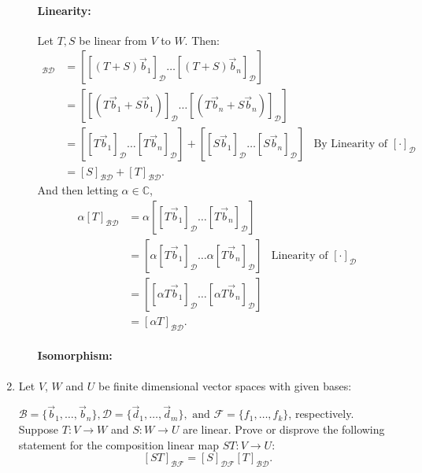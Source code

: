 \documentclass{article}
\begin{document}
\begin{enumerate}
\begin{enumerate}
          \paragraph{Linearity: }Let $T,S$ be linear from $V$ to $W$. Then:
          \begin{align*}
              [T+S]_{\mathcal{B}\mathcal{D}}&= \left[ [(T+S)\vec{b}_1]_\mathcal{D} \ldots [(T+S)\vec{b}_n]_\mathcal{D}  \right] \\
               &= \left[ [(T\vec{b}_1+S\vec{b}_1)]_\mathcal{D} \ldots [(T\vec{b}_n+S\vec{b}_n)]_\mathcal{D}  \right]\\
               &= \left[ [T\vec{b}_1]_\mathcal{D}\ldots [T\vec{b}_n]_\mathcal{D} \right] + \left[ [S\vec{b}_1]_\mathcal{D}\ldots [S\vec{b}_n]_\mathcal{D} \right] &\text{By Linearity of }[\cdot]_\mathcal{D}\\
               &=  [S]_{\mathcal{B}\mathcal{D}} +[T]_{\mathcal{B}\mathcal{D}} 
          .\end{align*}
          And then letting $\alpha\in \mathbb{C}$,
           \begin{align*}
               \alpha[T]_{\mathcal{B}\mathcal{D}}&=\alpha\left[ [T\vec{b}_1]_\mathcal{D}\ldots[T\vec{b}_n]_\mathcal{D} \right] \\
                         &=\left[ \alpha[T\vec{b}_1]_\mathcal{D} \ldots\alpha[T\vec{b}_n]_\mathcal{D}  \right]&\text{Linearity of }[\cdot]_\mathcal{D}\\
                         &=\left[ [\alpha T\vec{b}_1]_\mathcal{D} \ldots[\alpha T\vec{b}_n]_\mathcal{D} \right] \\
               &= [\alpha T]_{\mathcal{B}\mathcal{D}} 
          .\end{align*}
          \paragraph{Isomorphism: } %
      \end{enumerate}
    \item Let $V$, $W$ and $U$ be finite dimensional vector spaces with given bases: 

        $\mathcal{B} = \{\vec{b}_1,\ldots,\vec{b}_n\}, \mathcal{D} = \{\vec{d}_1,\ldots,\vec{d}_m\}, \text{ and } \mathcal{F} = \{f_1,\ldots,f_k\}$, respectively. Suppose $T : V \to W$ and $S : W \to U$ are linear. Prove or disprove the following statement for the composition linear map  $ST : V \to U$:
      \[
      [ST]_{\mathcal{B}\mathcal{F}}=[S]_{\mathcal{DF}}[T]_{\mathcal{B}\mathcal{D}}
      .\] 


\end{enumerate}
\end{document}
